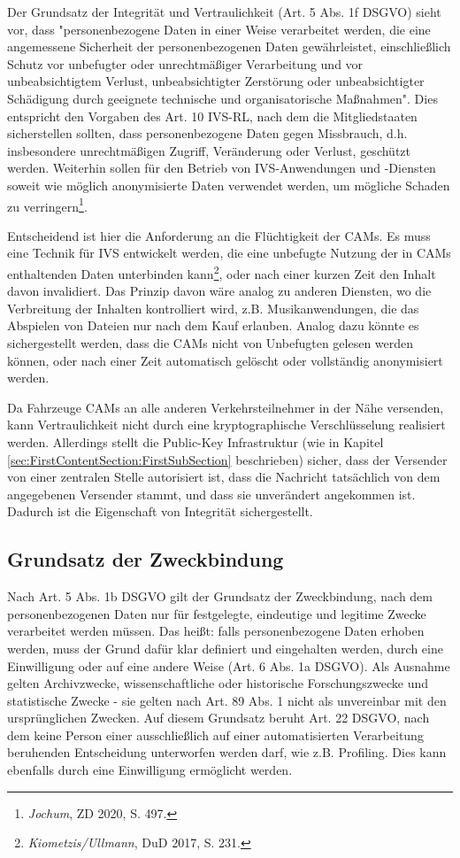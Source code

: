 Der Grundsatz der Integrität und Vertraulichkeit (Art. 5 Abs. 1f DSGVO) sieht vor, dass "personenbezogene Daten in einer Weise verarbeitet werden, die eine angemessene Sicherheit der personenbezogenen Daten gewährleistet, einschließlich Schutz vor unbefugter oder unrechtmäßiger Verarbeitung und vor unbeabsichtigtem Verlust, unbeabsichtigter Zerstörung oder unbeabsichtigter Schädigung durch geeignete technische und organisatorische Maßnahmen". Dies entspricht den Vorgaben des Art. 10 IVS-RL, nach dem die Mitgliedstaaten sicherstellen sollten, dass personenbezogene Daten gegen Missbrauch, d.h. insbesondere unrechtmäßigen Zugriff, Veränderung oder Verlust, geschützt werden. Weiterhin sollen für den Betrieb von IVS-Anwendungen und -Diensten soweit wie möglich anonymisierte Daten verwendet werden, um mögliche Schaden zu verringern\footnote{\emph{Jochum}, ZD 2020, S. 497.}. 

Entscheidend ist hier die Anforderung an die Flüchtigkeit der CAMs. Es muss eine Technik für IVS entwickelt werden, die eine unbefugte Nutzung der in CAMs enthaltenden Daten unterbinden kann\footnote{\emph{Kiometzis/Ullmann}, DuD 2017, S. 231.}, oder nach einer kurzen Zeit den Inhalt davon invalidiert. Das Prinzip davon wäre analog zu anderen Diensten, wo die Verbreitung der Inhalten kontrolliert wird, z.B. Musikanwendungen, die das Abspielen von Dateien nur nach dem Kauf erlauben. Analog dazu könnte es sichergestellt werden, dass die CAMs nicht von Unbefugten gelesen werden können, oder nach einer Zeit automatisch gelöscht oder vollständig anonymisiert werden. 

Da Fahrzeuge CAMs an alle anderen Verkehrsteilnehmer in der Nähe versenden, kann Vertraulichkeit nicht durch eine kryptographische Verschlüsselung realisiert werden. Allerdings stellt die Public-Key Infrastruktur (wie in Kapitel \ref{sec:FirstContentSection:FirstSubSection} beschrieben) sicher, dass der Versender von einer zentralen Stelle autorisiert ist, dass die Nachricht tatsächlich von dem angegebenen Versender stammt, und dass sie unverändert angekommen ist. Dadurch ist die Eigenschaft von Integrität sichergestellt.

\subsection{Grundsatz der Zweckbindung}

Nach Art. 5 Abs. 1b DSGVO gilt der Grundsatz der Zweckbindung, nach dem personenbezogenen Daten nur für festgelegte, eindeutige und legitime Zwecke verarbeitet werden müssen. Das heißt: falls personenbezogene Daten erhoben werden, muss der Grund dafür klar definiert und eingehalten werden, durch eine Einwilligung oder auf eine andere Weise (Art. 6 Abs. 1a DSGVO). Als Ausnahme gelten Archivzwecke, wissenschaftliche oder historische Forschungszwecke und statistische Zwecke - sie gelten nach Art. 89 Abs. 1 nicht als unvereinbar mit den ursprünglichen Zwecken. Auf diesem Grundsatz beruht Art. 22 DSGVO, nach dem keine Person einer ausschließlich auf einer automatisierten Verarbeitung beruhenden Entscheidung unterworfen werden darf, wie z.B. Profiling. Dies kann ebenfalls durch eine Einwilligung ermöglicht werden.

